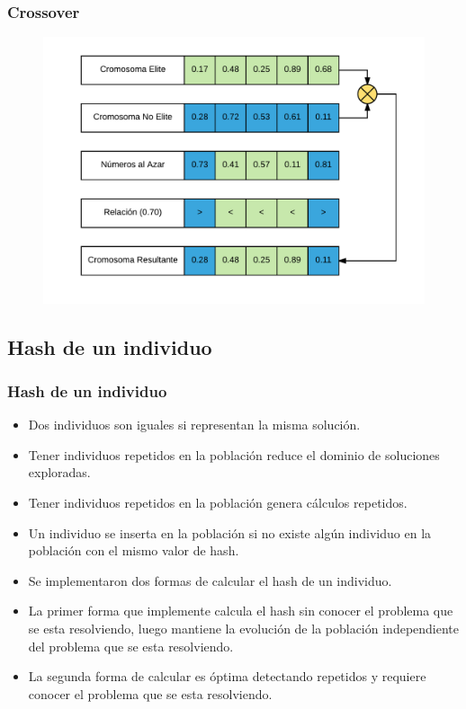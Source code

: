 \documentclass{beamer}
\begin{document}

\begin{frame}
\frametitle{Crossover}

\begin{figure}[h]
	\centering
	\includegraphics[width=12cm]{BiasCrossover}
	\label{fig:BiasCrossover}
\end{figure}

\end{frame}


\subsection{Hash de un individuo}

\begin{frame}
\frametitle{Hash de un individuo}

\begin{itemize}
    \item Dos individuos son iguales si representan la misma solución.
    \pause
    \item Tener individuos repetidos en la población reduce el dominio de soluciones exploradas.
    \pause
    \item Tener individuos repetidos en la población genera cálculos repetidos.
    \pause
    \item Un individuo se inserta en la población si no existe algún individuo en la población con el mismo valor de hash.
    \pause
    \item Se implementaron dos formas de calcular el hash de un individuo.
    \pause
    \item La primer forma que implemente calcula el hash sin conocer el problema que se esta resolviendo, luego mantiene la evolución de la población independiente del problema que se esta resolviendo.
    \pause
    \item La segunda forma de calcular es óptima detectando repetidos y requiere conocer el problema que se esta resolviendo.
\end{itemize}

\end{frame}
\end{document}
